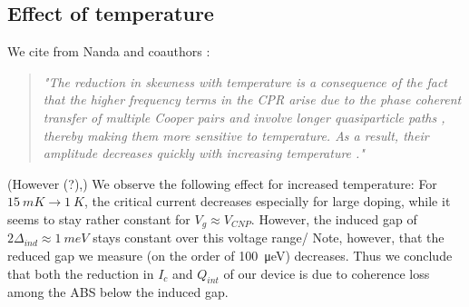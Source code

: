 \subsection{Effect of temperature}
We cite from Nanda and coauthors \cite{nanda_current-phase_2017}:
\begin{quotation}
	\textit{"The reduction in skewness with temperature is a consequence of the fact that the higher frequency terms in the CPR arise due to the phase coherent transfer of multiple Cooper pairs and involve longer quasiparticle paths \cite{heikkila_supercurrent-carrying_2002}, thereby making them more sensitive to temperature.
	As a result, their amplitude decreases quickly with increasing temperature \cite{hagymasi_josephson_2010,black-schaffer_strongly_2010,rakyta_magnetic_2016,english_observation_2016}."}
\end{quotation}

(However (?),) We observe the following effect for increased temperature:
For $\SI{15}{mK}\rightarrow\SI{1}{K}$, the critical current decreases especially for large doping, while it seems to stay rather constant for $V_g\approx V_{CNP}$.
However, the induced gap of $2\Delta_{ind}\approx\SI{1}{meV}$ stays constant over this voltage range/ Note, however, that the reduced gap we measure (on the order of \SI{100}{\micro eV}) decreases.
Thus we conclude that both the reduction in $I_c$ and $Q_{int}$ of our device is due to coherence loss among the ABS below the induced gap.